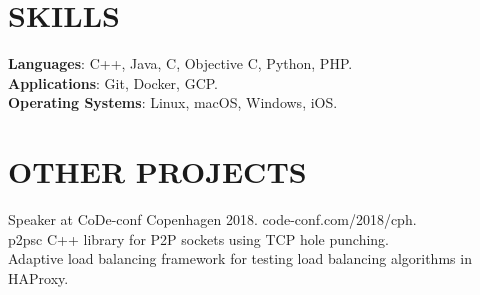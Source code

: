 \documentclass[overlapped,12pt]{res}
\begin{document}
\begin{resume}
\section{SKILLS}
\textbf{Languages}: C++, Java, C, Objective C, Python, PHP.\\
\textbf{Applications}: Git, Docker, GCP.\\
\textbf{Operating Systems}: Linux, macOS, Windows, iOS.

\section{OTHER PROJECTS}
Speaker at CoDe-conf Copenhagen 2018. code-conf.com/2018/cph.\\
p2psc C++ library for P2P sockets using TCP hole punching.\\
Adaptive load balancing framework for testing load balancing algorithms in
HAProxy.
\end{resume}
\end{document}
